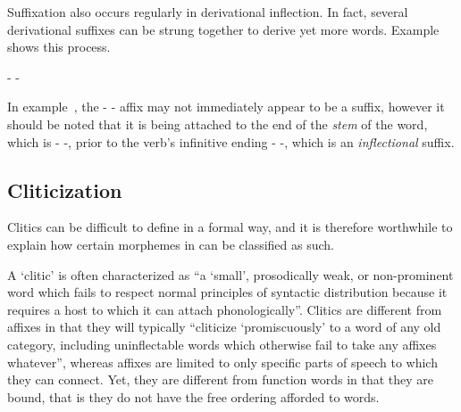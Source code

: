 Suffixation also occurs regularly in derivational inflection. In fact, several derivational suffixes can be strung together to derive yet more words. Example~ shows this process.

	   
	\a<der11>   
	\a<der12>  - -  
	\a<root2>   
	\a<der21>   
	\a<der22>   
\xe

In example~, the - - affix may not immediately appear to be a suffix, however it should be noted that it is being attached to the end of the \emph{stem} of the word, which is - -, prior to the verb's infinitive ending - -, which is an \emph{inflectional} suffix.


\subsection{Cliticization}
\label{subsec:tvk-cliticization}

Clitics can be difficult to define in a formal way, and it is therefore worthwhile to explain how certain morphemes in \langtvk{} can be classified as such.

A \enquote*{clitic} is often characterized as \enquote{a \enquote{small}, prosodically weak, or non-prominent word which fails to respect normal principles of syntactic distribution because it requires a host to which it can attach phonologically}\autocite{spencer-luis-2012}. Clitics are different from affixes in that they will typically \enquote{cliticize \enquote{promiscuously} to a word of any old category, including uninflectable words which otherwise fail to take any affixes whatever}\autocite{spencer-luis-2012}, whereas affixes are limited to only specific parts of speech to which they can connect\autocite{Zwicky-and-pullum-1983}. Yet, they are different from function words in that they are bound, that is they do not have the free ordering afforded to words\autocite{Zwicky-1985}.

